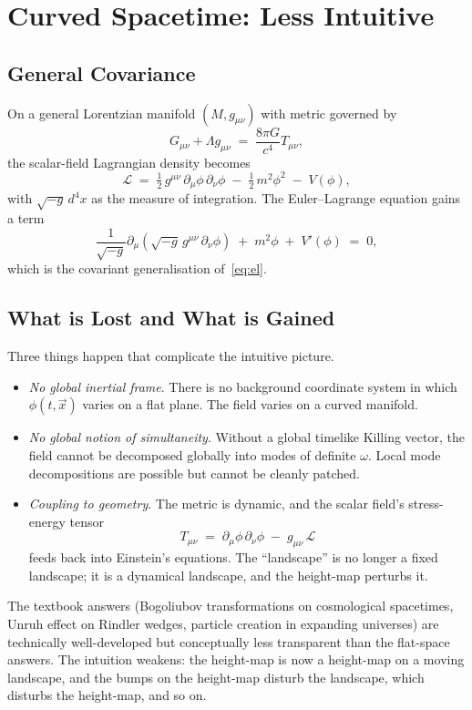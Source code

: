\documentclass[11pt]{article}
\begin{document}
\section{Curved Spacetime: Less Intuitive}
\label{sec:curved}

\subsection{General Covariance}

On a general Lorentzian manifold $(M, g_{\mu\nu})$ with metric governed by
\begin{equation}
G_{\mu\nu} + \Lambda g_{\mu\nu} \;=\; \frac{8 \pi G}{c^4} T_{\mu\nu},
\label{eq:efe}
\end{equation}
the scalar-field Lagrangian density becomes
\begin{equation}
\mathcal{L} \;=\; \tfrac{1}{2}\, g^{\mu\nu}\, \partial_\mu \phi\, \partial_\nu \phi \;-\; \tfrac{1}{2}\, m^2 \phi^2 \;-\; V(\phi),
\label{eq:lagrangian-curved}
\end{equation}
with $\sqrt{-g}\, d^4 x$ as the measure of integration. The Euler--Lagrange equation gains a term
\begin{equation}
\frac{1}{\sqrt{-g}}\partial_\mu(\sqrt{-g}\, g^{\mu\nu}\, \partial_\nu \phi) \;+\; m^2 \phi \;+\; V'(\phi) \;=\; 0,
\label{eq:el-curved}
\end{equation}
which is the covariant generalisation of~\eqref{eq:el}.

\subsection{What is Lost and What is Gained}

Three things happen that complicate the intuitive picture.
\begin{itemize}
    \item \emph{No global inertial frame}. There is no background coordinate system in which $\phi(t, \vec{x})$ varies on a flat plane. The field varies on a curved manifold.
    \item \emph{No global notion of simultaneity}. Without a global timelike Killing vector, the field cannot be decomposed globally into modes of definite $\omega$. Local mode decompositions are possible but cannot be cleanly patched.
    \item \emph{Coupling to geometry}. The metric is dynamic, and the scalar field's stress-energy tensor
    \[
    T_{\mu\nu} \;=\; \partial_\mu \phi\, \partial_\nu \phi \;-\; g_{\mu\nu}\,\mathcal{L}
    \]
    feeds back into Einstein's equations. The ``landscape'' is no longer a fixed landscape; it is a dynamical landscape, and the height-map perturbs it.
\end{itemize}
The textbook answers (Bogoliubov transformations on cosmological spacetimes, Unruh effect on Rindler wedges, particle creation in expanding universes) are technically well-developed but conceptually less transparent than the flat-space answers. The intuition weakens: the height-map is now a height-map on a moving landscape, and the bumps on the height-map disturb the landscape, which disturbs the height-map, and so on.
\end{document}
